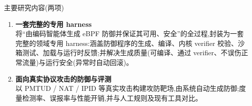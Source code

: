 \documentclass[aspectratio=169,10pt]{beamer}
\begin{document}
\begin{frame}{主要研究内容(两项)}
    \begin{enumerate}\itemsep=1.0em
        \item \textbf{一套完整的专用 harness}\\
        \footnotesize\color{thugray}将“由编码智能体生成 eBPF 防御并保证其可用、安全”的全过程,封装为一套完整的领域专用 harness:涵盖防御程序的生成、编译、内核 verifier 校验、沙箱测试、加载与运行时反馈;并解决生成质量(可编译、通过 verifier、不误伤正常流量)与运行安全(异常时自动回滚)。\normalsize\par
        \item \textbf{面向真实协议攻击的防御与评测}\\
        \footnotesize\color{thugray}以 PMTUD / NAT / IPID 等真实攻击构建攻防靶场,由系统自动生成防御;度量检测率、误报率与性能开销,并与人工规则及现有工具对比。\normalsize\par
    \end{enumerate}
\end{frame}
\end{document}
